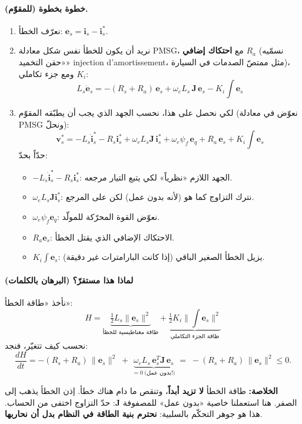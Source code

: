 \documentclass[11pt,a4paper]{article}
\newcommand{\fr}[1]{\textfrench{#1}}
\newcommand{\bv}[1]{\boldsymbol{#1}}
\newcommand{\Khulasa}{\textbf{الخلاصة: }}
\begin{document}
\paragraph{خطوة بخطوة (للمقوّم).}
\begin{enumerate}
\item نعرّف الخطأ: $\bv{e}_s = \bv{i}_s - \bv{i}_s^*$.
\item نريد أن يكون للخطأ نفس شكل معادلة \fr{PMSG}، مع \textbf{احتكاك إضافي} $R_a$ (نسمّيه «حقن التخميد»
\fr{injection d'amortissement}، مثل ممتصّ الصدمات في السيارة)، ومع جزء تكاملي $K_i$:
\[
L_s\dot{\bv{e}}_s = -(R_s+R_a)\,\bv{e}_s + \omega_e L_s\,\mathbf{J}\,\bv{e}_s - K_i\!\int\!\bv{e}_s
\]
\item لكي نحصل على هذا، نحسب الجهد الذي يجب أن يطبّقه المقوّم (نعوّض في معادلة \fr{PMSG} ونحلّ):
\begin{equation}
\boxed{\bv{v}_s^* = -L_s\dot{\bv{i}}_s^* - R_s\bv{i}_s^* + \omega_e L_s\mathbf{J}\,\bv{i}_s^* + \omega_e\psi_f\,\bv{e}_q + R_a\,\bv{e}_s + K_i\!\int\!\bv{e}_s}
\end{equation}
حدّاً بحدّ:
\begin{itemize}
\item $-L_s\dot{\bv{i}}_s^* - R_s\bv{i}_s^*$: الجهد اللازم «نظرياً» لكي يتبع التيار مرجعه.
\item $\omega_e L_s\mathbf{J}\bv{i}_s^*$: نترك التزاوج كما هو (لأنه بدون عمل) لكن على المرجع.
\item $\omega_e\psi_f\bv{e}_q$: نعوّض القوة المحرّكة للمولّد.
\item $R_a\bv{e}_s$: الاحتكاك الإضافي الذي يقتل الخطأ.
\item $K_i\int\bv{e}_s$: يزيل الخطأ الصغير الباقي (إذا كانت البارامترات غير دقيقة).
\end{itemize}
\end{enumerate}

\paragraph{لماذا هذا مستقرّ؟ (البرهان بالكلمات)}
نأخذ «طاقة الخطأ»:
\[
H = \underbrace{\tfrac12 L_s\|\bv{e}_s\|^2}_{\text{طاقة مغناطيسية للخطأ}} + \underbrace{\tfrac12 K_i\|\textstyle\int\bv{e}_s\|^2}_{\text{طاقة الجزء التكاملي}}
\]
نحسب كيف تتغيّر، فنجد:
\[
\frac{dH}{dt} = -(R_s+R_a)\,\|\bv{e}_s\|^2 \;+\; \underbrace{\omega_e L_s\,\bv{e}_s^T\mathbf{J}\,\bv{e}_s}_{=0\ \text{(بدون عمل!)}} \;=\; -(R_s+R_a)\,\|\bv{e}_s\|^2 \le 0 .
\]
\begin{khulasa}
\Khulasa
طاقة الخطأ \textbf{لا تزيد أبداً}، وتنقص ما دام هناك خطأ. إذن الخطأ يذهب إلى الصفر.
هنا استعملنا خاصية «بدون عمل» للمصفوفة $\mathbf{J}$: حدّ التزاوج اختفى من الحساب.
هذا هو جوهر التحكّم بالسلبية: \textbf{نحترم بنية الطاقة في النظام بدل أن نحاربها}.
\end{khulasa}
\end{document}
